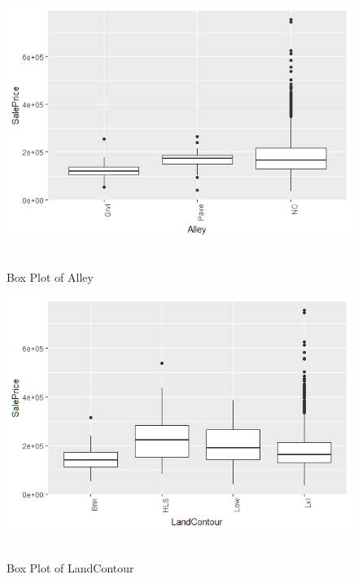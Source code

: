\documentclass[fleqn,10pt]{SelfArx} %
\begin{document}
\begin{figure}[h!]\centering
\includegraphics[scale=0.4]{Boxplot2_Alley}
\\ \caption{\\ Box Plot of Alley}
\end{figure}

\begin{figure}[h!]\centering
\includegraphics[scale=0.4]{Boxplot3_LandContour}
\\ \caption{\\ Box Plot of LandContour}
\end{figure}
\end{document}
